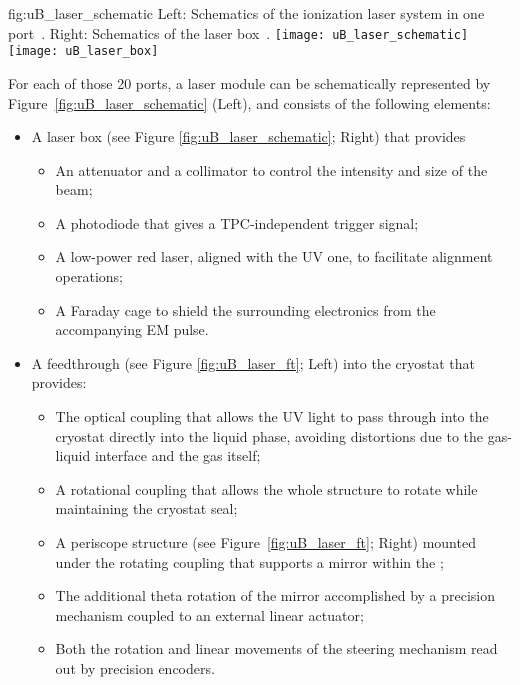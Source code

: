 \begin{dunefigure}{fig:uB_laser_schematic}
{Left: Schematics of the ionization laser system in one port~\cite{Antonello:2015lea}. Right: Schematics of the laser box~\cite{microboone}.}
\texttt{[image: uB\_laser\_schematic]}
\texttt{[image: uB\_laser\_box]}
\end{dunefigure}



For each of those \num{20} ports, a laser module can be schematically represented by Figure~\ref{fig:uB_laser_schematic} (Left), and consists of the following elements:
\begin{itemize}
    \item A laser box (see Figure \ref{fig:uB_laser_schematic}; Right) that provides
    \begin{itemize}
        \item An attenuator and a collimator to control the intensity and size of the beam;
        \item A photodiode that gives a TPC-independent trigger signal;
        \item A low-power red laser, aligned with the UV one, to facilitate alignment operations;
        \item A Faraday cage to shield the surrounding electronics from the accompanying EM pulse.
    \end{itemize}
    \item A feedthrough (see Figure \ref{fig:uB_laser_ft}; Left) into the cryostat that provides:
    \begin{itemize}
        \item The optical coupling that allows the UV light to pass through into the cryostat directly into the liquid phase, avoiding distortions due to the gas-liquid interface and the gas itself;
        \item A rotational coupling that allows the whole structure to rotate while maintaining the cryostat seal;
        \item A periscope structure (see Figure~\ref{fig:uB_laser_ft}; Right) mounted under the rotating coupling that supports a mirror within the ;
        \item The additional theta rotation of the mirror accomplished by a precision mechanism coupled to an external linear actuator;
        \item Both the rotation and linear movements of the steering mechanism read out by precision encoders.
    \end{itemize}
    
\end{itemize}


